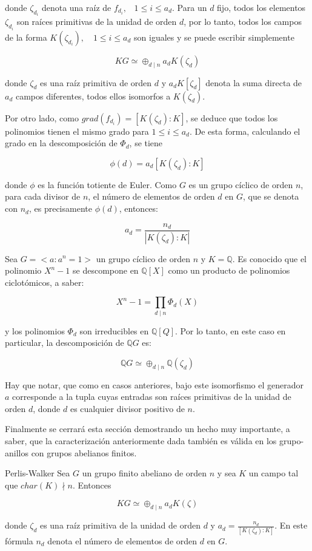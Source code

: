 donde $\zeta_{d_i}$ denota una raíz de $f_{d_i}  \mbox{,} \quad 1 \leq i \leq a_d $. Para un $d$ fijo, todos los elementos $\zeta_{d_i}$ son raíces primitivas de la unidad de orden $d$, por lo tanto, todos los campos de la forma $K(\zeta_{d_i}), \quad 1\leq i \leq a_d$ son iguales y se puede escribir simplemente 

\[ KG \simeq \oplus_{d \mid n} a_dK(\zeta_d)\]

donde $\zeta_d$ es una raíz primitiva de orden $d$ y $a_dK[\zeta_d]$ denota la suma directa de $a_d$ campos diferentes, todos ellos isomorfos a $K(\zeta_d)$.

Por otro lado, como $grad(f_{d_i}) = [K(\zeta_d):K]$, se deduce que todos los polinomios tienen el mismo grado para $1 \leq i \leq a_d$. De esta forma, calculando el grado en la descomposición de $\Phi_d$, se tiene

\[ \phi(d) = a_d[K(\zeta_d):K] \]

donde $\phi$ es la función totiente de Euler. Como $G$ es un grupo cíclico de orden $n$, para cada divisor de $n$, el número de elementos de orden $d$ en $G$, que se denota con $n_d$, es precisamente $\phi(d)$, entonces:

\[ a_d = \frac{n_d}{| K(\zeta_d) : K|}  \]

\begin{ejemplo}
Sea $G = < a \colon a^n = 1 >$  un grupo cíclico de orden $n$ y $K = \mathds{Q} $. Es conocido que el polinomio $X^n-1$ se descompone en $\mathds{Q}[X]$ como un producto de polinomios ciclotómicos, a saber:

\[ X^n -1 = \prod_{d \mid n}\Phi_d(X)  \]

y los polinomios $\Phi_d$ son irreducibles en $\mathds{Q}[Q]$. Por lo tanto, en este caso en particular, la descomposición de $\mathds{Q}G$ es:

\[ \mathds{Q}G \simeq \oplus_{d\mid n} \mathds{Q}(\zeta_d)  \]

Hay que notar, que como en casos anteriores, bajo este isomorfismo el generador $a$ corresponde a la tupla cuyas entradas son raíces primitivas de la unidad de orden $d$, donde $d$ es cualquier divisor positivo de $n$. 
\end{ejemplo}

Finalmente se cerrará esta sección demostrando un hecho muy importante, a saber, que la caracterización anteriormente dada  también es válida en los grupo-anillos con grupos  abelianos finitos.

\begin{teorema}{Perlis-Walker}
Sea $G$ un grupo finito abeliano de orden $n$ y sea $K$ un campo tal que $char(K)\nmid n$. Entonces

\[  KG \simeq \oplus_{d\mid n}a_dK(\zeta) \]

donde $\zeta_d$ es una raíz primitiva de la unidad de orden $d$ y $a_d = \frac{n_d}{[K(\zeta_d):K]}$. En este fórmula $n_d$ denota el número de elementos de orden $d$ en $G$.
\end{teorema} 

